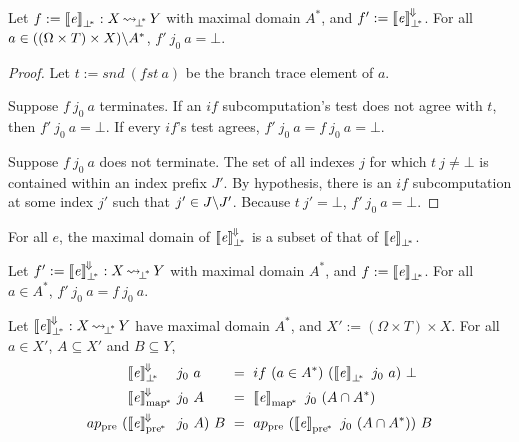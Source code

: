 \begin{theorem}
Let $f := \left\llbracket{\mathit{e}}\right\rrbracket_{\bot^{\mspace{-4mu}*}} : X \operatorname{\rightsquigarrow_{\mspace{-3mu}{\bot^{\mspace{-4mu}*}}}} Y$ with maximal domain $A^*$, and $f' := \left\llbracket{\mathit{e}}\right\rrbracket^{\mspace{-2mu}\Downarrow\mspace{-2mu}}_{\bot^{\mspace{-4mu}*}}$.
For all $a \in ((\Omega \times T) \times X) \backslash A^*$, $f'~j_0~a = \bot$.
\end{theorem}
\begin{proof}
Let $t := snd~(fst~a)$ be the branch trace element of $a$.

Suppose $f~j_0~a$ terminates.
If an $if$ subcomputation's test does not agree with $t$, then $f'~j_0~a = \bot$.
If every $if$'s test agrees, $f'~j_0~a = f~j_0~a = \bot$.

Suppose $f~j_0~a$ does not terminate.
The set of all indexes $j$ for which $t~j \neq \bot$ is contained within an index prefix $J'$.
By hypothesis, there is an $if$ subcomputation at some index $j'$ such that $j' \in J \backslash J'$.
Because $t~j' = \bot$, $f'~j_0~a = \bot$.
\end{proof}

\begin{corollary}
For all $\mathit{e}$, the maximal domain of $\left\llbracket{\mathit{e}}\right\rrbracket^{\mspace{-2mu}\Downarrow\mspace{-2mu}}_{\bot^{\mspace{-4mu}*}}$ is a subset of that of $\left\llbracket{\mathit{e}}\right\rrbracket_{\bot^{\mspace{-4mu}*}}$.
\end{corollary}

\begin{corollary}
Let $f' := \left\llbracket{\mathit{e}}\right\rrbracket^{\mspace{-2mu}\Downarrow\mspace{-2mu}}_{\bot^{\mspace{-4mu}*}} : X \operatorname{\rightsquigarrow_{\mspace{-3mu}{\bot^{\mspace{-4mu}*}}}} Y$ with maximal domain $A^*$, and $f := \left\llbracket{\mathit{e}}\right\rrbracket_{\bot^{\mspace{-4mu}*}}$.
For all $a \in A^*$, $f'~j_0~a = f~j_0~a$.
\end{corollary}


\begin{corollary}
\label{cor:correct-convergence}
Let $\left\llbracket{\mathit{e}}\right\rrbracket^{\mspace{-2mu}\Downarrow\mspace{-2mu}}_{\bot^{\mspace{-4mu}*}} : X \operatorname{\rightsquigarrow_{\mspace{-3mu}{\bot^{\mspace{-4mu}*}}}} Y$ have maximal domain $A^*$, and $X' := (\Omega \times T) \times X$.
For all $a \in X'$, $A \subseteq X'$ and $B \subseteq Y$,
\begin{equation}
\begin{aligned}
	&\meaningofconv{\mathit{e}}_\pbot &&\!\!\!\!j_0~a &&\!\!\!\!= \ if~(a \in A^*)~(\meaningof{\mathit{e}}_\pbot~j_0~a)~\bot \\
	&\meaningofconv{\mathit{e}}\pmap &&\!\!\!\!j_0~A &&\!\!\!\!= \ \meaningof{\mathit{e}}\pmap~j_0~(A \i A^*) \\
	ap\pre~(\!&\meaningofconv{\mathit{e}}\ppre &&\!\!\!\!j_0~A)~B &&\!\!\!\!= \ ap\pre~(\meaningof{\mathit{e}}\ppre~j_0~(A \i A^*))~B
\end{aligned}
\end{equation}
\end{corollary}

